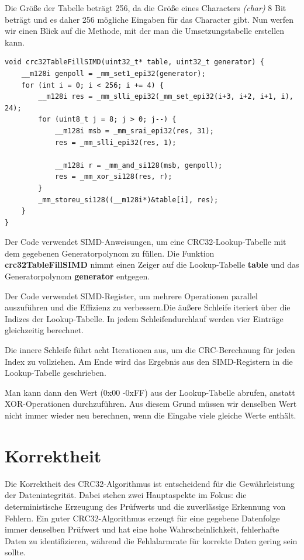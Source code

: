 \documentclass[course=erap]{aspdoc}
\begin{document}
Die Größe der Tabelle beträgt 256, da die Größe eines Characters \textit{(char)} 8 Bit beträgt und es daher 256 mögliche Eingaben für das Character gibt. Nun werfen wir einen Blick auf die Methode, mit der man die Umsetzungstabelle erstellen kann.\\ 
\begin{lstlisting}[style=CStyle]
 void crc32TableFillSIMD(uint32_t* table, uint32_t generator) {
    __m128i genpoll = _mm_set1_epi32(generator);
    for (int i = 0; i < 256; i += 4) {
        __m128i res = _mm_slli_epi32(_mm_set_epi32(i+3, i+2, i+1, i), 24);
        for (uint8_t j = 8; j > 0; j--) {
            __m128i msb = _mm_srai_epi32(res, 31);
            res = _mm_slli_epi32(res, 1);

            __m128i r = _mm_and_si128(msb, genpoll);
            res = _mm_xor_si128(res, r); 
        }
        _mm_storeu_si128((__m128i*)&table[i], res); 
    }
}
\end{lstlisting}
Der Code verwendet SIMD-Anweisungen, um eine CRC32-Lookup-Tabelle mit dem gegebenen Generatorpolynom zu füllen. Die Funktion \textbf{crc32TableFillSIMD} nimmt einen Zeiger auf die Lookup-Tabelle \textbf{table} und das Generatorpolynom \textbf{generator} entgegen.

Der Code verwendet SIMD-Register, um mehrere Operationen parallel auszuführen und die Effizienz zu verbessern.Die äußere Schleife iteriert über die Indizes der Lookup-Tabelle. In jedem Schleifendurchlauf werden vier Einträge gleichzeitig berechnet.

Die innere Schleife führt acht Iterationen aus, um die CRC-Berechnung für jeden Index zu vollziehen. Am Ende wird das Ergebnis aus den SIMD-Registern in die Lookup-Tabelle geschrieben.

Man kann dann den Wert (0x00 -0xFF) aus der Lookup-Tabelle abrufen, anstatt XOR-Operationen durchzuführen. Aus diesem Grund müssen wir denselben Wert nicht immer wieder neu berechnen, wenn die Eingabe viele gleiche Werte enthält.
\section{Korrektheit}
Die Korrektheit des CRC32-Algorithmus ist entscheidend für die Gewährleistung der Datenintegrität. Dabei stehen zwei Hauptaspekte im Fokus: die deterministische Erzeugung des Prüfwerts und die zuverlässige Erkennung von Fehlern. Ein guter CRC32-Algorithmus erzeugt für eine gegebene Datenfolge immer denselben Prüfwert und hat eine hohe Wahrscheinlichkeit, fehlerhafte Daten zu identifizieren, während die Fehlalarmrate für korrekte Daten gering sein sollte.
\end{document}
